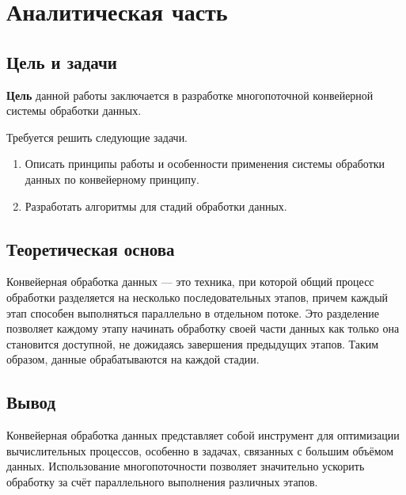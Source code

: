 \chapter{Аналитическая часть}

\section{Цель и задачи}
\textbf{Цель} данной работы заключается в разработке многопоточной конвейерной системы обработки данных.

Требуется решить следующие задачи.
\begin{enumerate}
	\item Описать принципы работы и особенности применения системы обработки данных по конвейерному принципу.
	\item Разработать алгоритмы для стадий обработки данных.
\end{enumerate}

\section{Теоретическая основа}
Конвейерная обработка данных — это техника, при которой общий процесс обработки разделяется на несколько последовательных этапов, причем каждый этап способен выполняться параллельно в отдельном потоке. Это разделение позволяет каждому этапу начинать обработку своей части данных как только она становится доступной, не дожидаясь завершения предыдущих этапов. Таким образом, данные обрабатываются на каждой стадии.

\section{Вывод}
Конвейерная обработка данных представляет собой инструмент для оптимизации вычислительных процессов, особенно в задачах, связанных с большим объёмом данных. Использование многопоточности позволяет значительно ускорить обработку за счёт параллельного выполнения различных этапов.